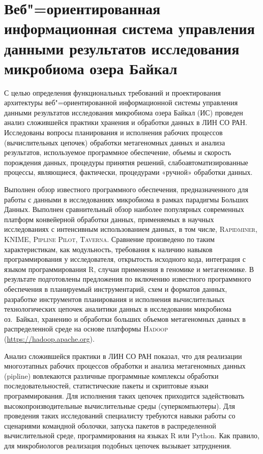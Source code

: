 \documentclass[a4paper,12pt,openany,final]{extreport}
\begin{document}
\chapter{Веб"=ориентированная информационная система управления данными результатов исследования микробиома озера Байкал}\label{chap:6}

С целью определения функциональных требований и проектирования архитектуры веб"=ориентированной информационной системы управления данными результатов исследования микробиома озера Байкал (ИС) проведен анализ сложившейся практики хранения и обработки данных в ЛИН СО РАН. Исследованы вопросы планирования и исполнения рабочих процессов (вычислительных цепочек) обработки метагеномных данных и анализа результатов, используемое программное обеспечение, объемы и скорость порождения данных, процедуры принятия решений, слабоавтоматизированные процессы, являющиеся, фактически, процедурами «ручной» обработки данных.

Выполнен обзор известного программного обеспечения, предназначенного для работы с данными в исследованиях микробиома в рамках парадигмы Больших Данных. Выполнен сравнительный обзор наиболее популярных современных платформ конвейерной обработки данных, применяемых в научных исследованиях с интенсивным использованием данных, в том числе, \textsc{Rapidminer}, \textsc{KNIME}, \textsc{Pipline Pilot}, \textsc{Taverna}. Сравнение произведено по таким характеристикам, как модульность, требования к наличию навыков программирования у исследователя, открытость исходного кода, интеграция с языком программирования R, случаи применения в геномике и метагеномике. В результате подготовлены предложения по включению известного программного обеспечения в планируемый инструментарий, схем и форматов данных, разработке инструментов планирования и исполнения вычислительных технологических цепочек аналитики данных в исследовании микробиома оз.~Байкал, хранению и обработки больших объемов метагеномных данных в распределенной среде на основе платформы \textsc{Hadoop} (\href{https://hadoop.apache.org/}{{https://hadoop.apache.org}}).

Анализ сложившейся практики в ЛИН СО РАН показал, что для реализации многоэтапных рабочих процессов обработки и анализа метагеномных данных (pipline) вовлекаются различные программные комплексы обработки последовательностей, статистические пакеты и скриптовые языки программирования. Для исполнения таких цепочек приходится задействовать высокопроизводительные вычислительные среды (суперкомпьютеры). Для проведения таких исследований специалисту требуются навыки работы со сценариями командной оболочки, запуска пакетов в распределенной вычислительной среде, программирования на языках R или Python. Как правило, для микробиологов реализация подобных цепочек вызывает затруднения.
\end{document}
